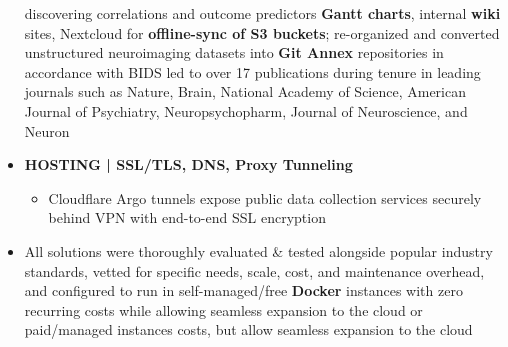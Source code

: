 \documentclass[10pt,a4paper,ragged2e]{altacv}
\begin{document}
\begin{fullwidth}
\begin{itemize}[label={}]
discovering correlations and outcome predictors
\textbf{Gantt charts}, internal \textbf{wiki} sites, Nextcloud for \textbf{offline-sync of S3 
buckets}; re-organized and converted unstructured neuroimaging datasets into \textbf{Git Annex} 
repositories in accordance with BIDS
led to over 17 publications during tenure in leading journals such as Nature, Brain, National 
Academy of Science, American Journal of Psychiatry, Neuropsychopharm, Journal of Neuroscience, and 
Neuron

    \item \textbf{HOSTING | SSL/TLS, DNS, Proxy Tunneling}
        \begin{itemize}[label={-},noitemsep]
            \item Cloudflare Argo tunnels expose public data collection services securely behind VPN 
with end-to-end SSL encryption
        \end{itemize}


    \item All solutions were thoroughly evaluated \& tested alongside popular industry standards, 
vetted for specific needs, scale, cost, and maintenance overhead, and configured to run in 
self-managed/free \textbf{Docker} instances with zero recurring costs while allowing seamless 
expansion to the cloud or paid/managed instances
costs, but allow seamless expansion to the cloud


\end{itemize}
\end{fullwidth}
\end{document}
